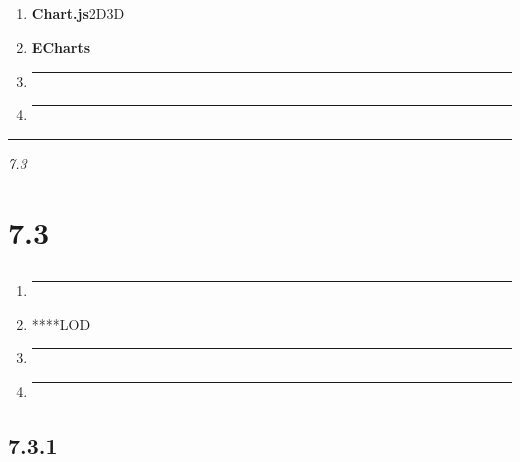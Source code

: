 \subsection{}\label{section-32}

\begin{enumerate}
\def\labelenumi{\arabic{enumi}.}
\item
  \textbf{Chart.js}2D3D
\item
  \textbf{ECharts}
\item
  \begin{center}\rule{0.5\linewidth}{0.5pt}\end{center}
\item
  \begin{center}\rule{0.5\linewidth}{0.5pt}\end{center}
\end{enumerate}

\begin{center}\rule{0.5\linewidth}{0.5pt}\end{center}

\emph{7.3}

\section{7.3}\label{section-33}

\subsection{}\label{section-34}

\begin{enumerate}
\def\labelenumi{\arabic{enumi}.}
\item
  \begin{center}\rule{0.5\linewidth}{0.5pt}\end{center}
\item
  ****LOD
\item
  \begin{center}\rule{0.5\linewidth}{0.5pt}\end{center}
\item
  \begin{center}\rule{0.5\linewidth}{0.5pt}\end{center}
\end{enumerate}

\subsection{7.3.1}\label{section-35}

